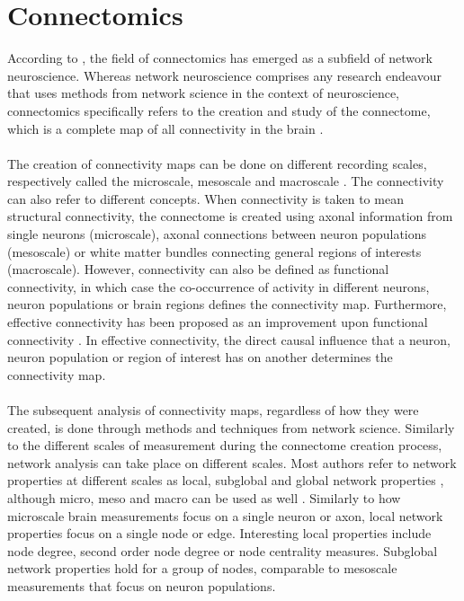 \documentclass[11pt]{report} %
\begin{document}
    \section{Connectomics}
According to , the field of connectomics has emerged as a subfield of network neuroscience. 
Whereas network neuroscience comprises any research endeavour that uses methods from network science in the context of neuroscience, connectomics specifically refers to the creation and study of the connectome, which is a complete map of all connectivity in the brain \cite{Sporns2005, Hagmann2005}.\\\\
The creation of connectivity maps can be done on different recording scales, respectively called the microscale, mesoscale and macroscale \cite{Sporns2016}. 
The connectivity can also refer to different concepts. 
When connectivity is taken to mean structural connectivity, the connectome is created using axonal information from single neurons (microscale), axonal connections between neuron populations (mesoscale) or white matter bundles connecting general regions of interests (macroscale). 
However, connectivity can also be defined as functional connectivity, in which case the co-occurrence of activity in different neurons, neuron populations or brain regions defines the connectivity map. 
Furthermore, effective connectivity has been proposed as an improvement upon functional connectivity \cite{friston2011}. 
In effective connectivity, the direct causal influence that a neuron, neuron population or region of interest has on another determines the connectivity map.\\\\
The subsequent analysis of connectivity maps, regardless of how they were created, is done through methods and techniques from network science. 
Similarly to the different scales of measurement during the connectome creation process, network analysis can take place on different scales. 
Most authors refer to network properties at different scales as local, subglobal and global network properties \cite{Takes2014}, although micro, meso and macro can be used as well . 
Similarly to how microscale brain measurements focus on a single neuron or axon, local network properties focus on a single node or edge. 
Interesting local properties include node degree, second order node degree or node centrality measures. 
Subglobal network properties hold for a group of nodes, comparable to mesoscale measurements that focus on neuron populations. 
\end{document}
